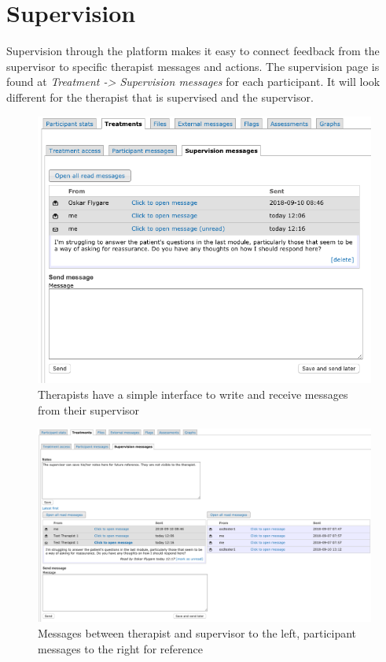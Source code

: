 \documentclass[]{book}
\begin{document}
\hypertarget{supervision}{%
\section{Supervision}\label{supervision}}

Supervision through the platform makes it easy to connect feedback from the supervisor to specific therapist messages and actions. The supervision page is found at \emph{Treatment -\textgreater{} Supervision messages} for each participant. It will look different for the therapist that is supervised and the supervisor.

\begin{figure}
\centering
\includegraphics{images/supervision-therapist.png}
\caption{Therapists have a simple interface to write and receive messages from their supervisor}
\end{figure}

\begin{figure}
\centering
\includegraphics{images/supervisor-view.png}
\caption{Messages between therapist and supervisor to the left, participant messages to the right for reference}
\end{figure}
\end{document}
